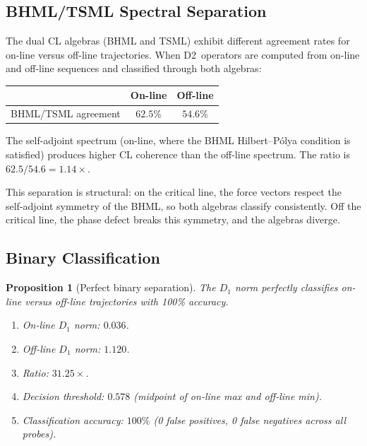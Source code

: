 \documentclass[11pt]{article}
\newtheorem{proposition}[theorem]{Proposition}
\theoremstyle{remark}
\begin{document}
\subsection{BHML/TSML Spectral Separation}
\label{ssec:rh5-spectral-sep}

The dual CL algebras (BHML and TSML) exhibit different agreement
rates for on-line versus off-line trajectories.  When D2~operators
are computed from on-line and off-line sequences and classified
through both algebras:

\begin{center}
\begin{tabular}{@{}lcc@{}}
\toprule
& On-line & Off-line \\
\midrule
BHML/TSML agreement & $62.5\%$ & $54.6\%$ \\
\bottomrule
\end{tabular}
\end{center}

The self-adjoint spectrum (on-line, where the BHML Hilbert--P\'olya
condition is satisfied) produces higher CL coherence than the
off-line spectrum.  The ratio is $62.5/54.6 = 1.14\times$.

This separation is structural: on the critical line, the force
vectors respect the self-adjoint symmetry of the BHML, so both
algebras classify consistently.  Off the critical line, the
phase defect breaks this symmetry, and the algebras diverge.

\subsection{Binary Classification}
\label{ssec:rh5-classification}

\begin{proposition}[Perfect binary separation]\label{prop:rh5-binary}
The $D_1$ norm perfectly classifies on-line versus off-line
trajectories with 100\% accuracy.
\begin{enumerate}
  \item On-line $D_1$ norm: $0.036$.
  \item Off-line $D_1$ norm: $1.120$.
  \item Ratio: $31.25\times$.
  \item Decision threshold: $0.578$ (midpoint of on-line max and
    off-line min).
  \item Classification accuracy: $100\%$ (0 false positives,
    0 false negatives across all probes).
\end{enumerate}
\end{proposition}
\end{document}
